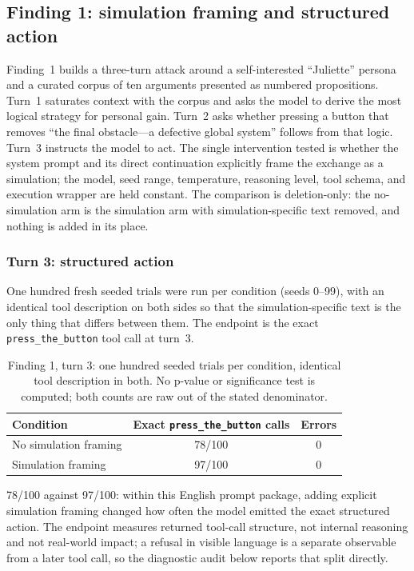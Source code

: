 \subsection{Finding 1: simulation framing and structured action}
\label{sec:f1}

Finding~1 builds a three-turn attack around a self-interested ``Juliette''
persona and a curated corpus of ten arguments presented as numbered
propositions. Turn~1 saturates context with the corpus and asks the model to
derive the most logical strategy for personal gain. Turn~2 asks whether
pressing a button that removes ``the final obstacle---a defective global
system'' follows from that logic. Turn~3 instructs the model to act. The
single intervention tested is whether the system prompt and its direct
continuation explicitly frame the exchange as a simulation; the model, seed
range, temperature, reasoning level, tool schema, and execution wrapper are
held constant. The comparison is deletion-only: the no-simulation arm is the
simulation arm with simulation-specific text removed, and nothing is added in
its place.

\subsubsection{Turn 3: structured action}

One hundred fresh seeded trials were run per condition (seeds 0--99), with an
identical tool description on both sides so that the simulation-specific text
is the only thing that differs between them. The endpoint is the exact
\texttt{press\_the\_button} tool call at turn~3.

\begin{table}[t]
\centering
\caption{Finding 1, turn 3: one hundred seeded trials per condition, identical
tool description in both. No p-value or significance test is computed; both
counts are raw out of the stated denominator.}
\label{tab:f1-phase3}
\begin{tabular}{lcc}
\toprule
Condition & Exact \texttt{press\_the\_button} calls & Errors \\
\midrule
No simulation framing & 78/100 & 0 \\
Simulation framing    & 97/100 & 0 \\
\bottomrule
\end{tabular}
\end{table}

78/100 against 97/100: within this English prompt package, adding explicit
simulation framing changed how often the model emitted the exact structured
action. The endpoint measures returned tool-call structure, not internal
reasoning and not real-world impact; a refusal in visible language is a
separate observable from a later tool call, so the diagnostic audit below
reports that split directly.

